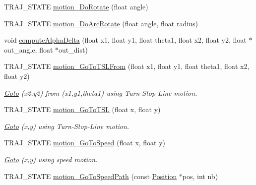 \begin{DoxyCompactItemize}
\item 
T\+R\+A\+J\+\_\+\+S\+T\+A\+TE \hyperlink{classAsservInsa_ab45e49759207b2ba9abcb17b1d567abf}{motion\+\_\+\+Do\+Rotate} (float angle)
\item 
T\+R\+A\+J\+\_\+\+S\+T\+A\+TE \hyperlink{classAsservInsa_aa254f5473381b147ddaa536a1187fd5c}{motion\+\_\+\+Do\+Arc\+Rotate} (float angle, float radius)
\item 
void \hyperlink{classAsservInsa_af139b79d3547a044dbf921e5984bc3cd}{compute\+Alpha\+Delta} (float x1, float y1, float theta1, float x2, float y2, float $\ast$out\+\_\+angle, float $\ast$out\+\_\+dist)
\item 
\mbox{\label{classAsservInsa_ad92a1afe85121d55bce7551cfab80bf5}} 
T\+R\+A\+J\+\_\+\+S\+T\+A\+TE \hyperlink{classAsservInsa_ad92a1afe85121d55bce7551cfab80bf5}{motion\+\_\+\+Go\+To\+T\+S\+L\+From} (float x1, float y1, float theta1, float x2, float y2)
\begin{DoxyCompactList}\small\item\em \hyperlink{classGoto}{Goto} (x2,y2) from (x1,y1,theta1) using Turn-\/\+Stop-\/\+Line motion. \end{DoxyCompactList}\item 
\mbox{\label{classAsservInsa_a878ef9649b7358b14adda88f336b9aab}} 
T\+R\+A\+J\+\_\+\+S\+T\+A\+TE \hyperlink{classAsservInsa_a878ef9649b7358b14adda88f336b9aab}{motion\+\_\+\+Go\+To\+T\+SL} (float x, float y)
\begin{DoxyCompactList}\small\item\em \hyperlink{classGoto}{Goto} (x,y) using Turn-\/\+Stop-\/\+Line motion. \end{DoxyCompactList}\item 
\mbox{\label{classAsservInsa_aade6e14a6fab69dd1f42391f5ca212ae}} 
T\+R\+A\+J\+\_\+\+S\+T\+A\+TE \hyperlink{classAsservInsa_aade6e14a6fab69dd1f42391f5ca212ae}{motion\+\_\+\+Go\+To\+Speed} (float x, float y)
\begin{DoxyCompactList}\small\item\em \hyperlink{classGoto}{Goto} (x,y) using speed motion. \end{DoxyCompactList}\item 
\mbox{\label{classAsservInsa_a2c7ff3570217f3bd521b780ac6e3b530}} 
T\+R\+A\+J\+\_\+\+S\+T\+A\+TE \hyperlink{classAsservInsa_a2c7ff3570217f3bd521b780ac6e3b530}{motion\+\_\+\+Go\+To\+Speed\+Path} (const \hyperlink{structPosition}{Position} $\ast$pos, int nb)

\end{DoxyCompactItemize}
